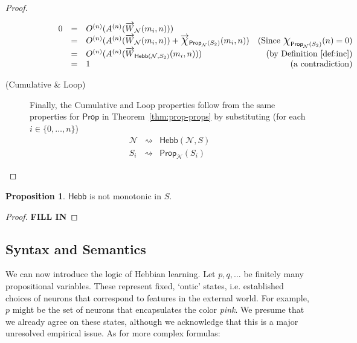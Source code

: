 \documentclass[letterpaper]{article}
\theoremstyle{definition}
\newtheorem{proposition}{Proposition}
\newcommand{\set}[1]{\{ #1 \}}
\newcommand*{\bigchi}{\mbox{\Large$\chi$}}%
\newcommand{\Prop}{\textsf{Prop}}
\newcommand{\Inc}{\textsf{Hebb}}
\newcommand{\Net}{\mathcal{N}}
\begin{document}
\begin{proof}
\begin{description}
\begin{description}
\[\begin{array}{lclr}
    0 & = & O^{(n)}(A^{(n)}(\overrightarrow{W}_{\Net}(m_i, n))) & 
    \\
    
    & = & O^{(n)}(A^{(n)}(\overrightarrow{W}_{\Net}(m_i, n)) + \overrightarrow{\bigchi}_{\Prop_{\Net}(S_2)}(m_i, n)) & 
    \mbox{(Since } \bigchi_{\Prop_\Net(S_2)}(n) = 0)\\
    
    & = & O^{(n)}(A^{(n)}(\overrightarrow{W}_{\Inc(\Net, S_2)}(m_i, n))) & 
    \mbox{(by Definition~\ref{def:inc})}\\
    
    & = & 1 & \mbox{(a contradiction)}
    \end{array}
    \]
    \end{description}
    
    \item[(Cumulative \& Loop)] Finally, the Cumulative and Loop properties follow from the same properties for $\Prop$ in Theorem~\ref{thm:prop-props} by substituting (for each $i \in \set{0, \ldots, n}$)
    \[
    \begin{array}{lcl}
    
    \Net & \rightsquigarrow & \Inc(\Net, S)\\
    S_i & \rightsquigarrow & \Prop_\Net(S_i)
    
    \end{array}
    \]
\end{description}
\end{proof}

\begin{proposition}
$\Inc$ is not monotonic in $S$.
\end{proposition}  
\begin{proof}
\textbf{\textcolor{myred}{FILL IN}}
\end{proof}

\subsection{Syntax and Semantics}

We can now introduce the logic of Hebbian learning.  Let $p, q, \ldots$ be finitely many propositional variables.  These represent fixed, `ontic' states, i.e. established choices of neurons that correspond to features in the external world.  For example, $p$ might be the set of neurons that encapsulates the color \emph{pink}.  We presume that we already agree on these states, although we acknowledge that this is a major unresolved empirical issue.  As for more complex formulas:
\end{document}
